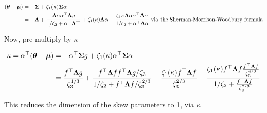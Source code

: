 \documentclass{amsart}
\begin{document}
\begin{align*}
({\boldsymbol \theta} - {\boldsymbol \mu}) &= -{\boldsymbol \Sigma} + \zeta_1(\kappa) {\boldsymbol \Sigma} \alpha \\
&=-{\boldsymbol \Lambda} + \frac{{\boldsymbol \Lambda} \alpha \alpha^\top {\boldsymbol\Lambda} g}{1/\zeta_2 + \alpha^\top {\boldsymbol\Lambda} \top}
	+ \zeta_1(\kappa) {\boldsymbol \Lambda} \alpha
	- \frac{\zeta_1{\kappa} {\boldsymbol \Lambda} \alpha \alpha^\top {\boldsymbol\Lambda} \alpha}{1/\zeta_2 + \alpha^\top{\boldsymbol\Lambda}\alpha}
	\text{ via the Sherman-Morrison-Woodbury formula}
\end{align*}

Now, pre-multiply by $\kappa$

\begin{align*}
\kappa = \alpha^\top({\boldsymbol \theta} - {\boldsymbol \mu}) &= -\alpha^\top {\boldsymbol\Sigma} g + \zeta_1(\kappa) \alpha^\top {\boldsymbol\Sigma} \alpha \\
&= \frac{f^\top {\boldsymbol\Lambda} g}{\zeta_3^{1/3}} + \frac{f^\top {\boldsymbol\Lambda} f f^\top {\boldsymbol\Lambda} g / \zeta_3}{1 / \zeta_2 + f^\top {\boldsymbol\Lambda} f / \zeta_3^{2 / 3}} + \frac{\zeta_1(\kappa) f^\top {\boldsymbol\Lambda} f}{\zeta_3^{2 / 3}} - \frac{\zeta_1(\kappa) f^\top {\boldsymbol\Lambda} f \frac{f^\top {\boldsymbol\Lambda} f}{\zeta_3^{4 / 3}}}{1 / \zeta_2 + \frac{f^\top {\boldsymbol\Lambda} f}{\zeta_3^{2/3}}}
\end{align*}

This reduces the dimension of the skew parameters to 1, via $\kappa$
\end{document}
